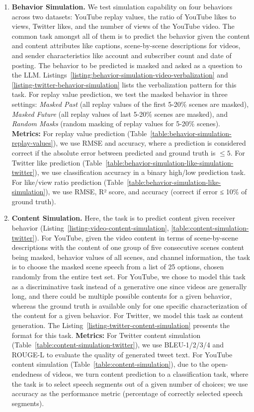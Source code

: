 \begin{enumerate}[leftmargin=*]
    \item\textbf{Behavior Simulation.} We test simulation capability on four behaviors across two datasets: YouTube replay values, the ratio of YouTube likes to views, Twitter likes, and the number of views of the YouTube video. The common task amongst all of them is to predict the behavior given the content and content attributes like captions, scene-by-scene descriptions for videos, and sender characteristics like account and subscriber count and date of posting. The behavior to be predicted is masked and asked as a question to the LLM. Listings~\ref{listing:behavior-simulation-video-verbalization} and \ref{listing-twitter-behavior-simulation} lists the verbalization pattern for this task. For replay value prediction, we test the masked behavior in three settings: \textit{Masked Past} (all replay values of the first 5-20\% scenes are masked), \textit{Masked Future} (all replay values of last 5-20\% scenes are masked), and \textit{Random Masks} (random masking of replay values for 5-20\% scenes). \textbf{Metrics:} For replay value prediction (Table~\ref{table:behavior-simulation-replay-values}), we use RMSE and accuracy, where a prediction is considered correct if the absolute error between predicted and ground truth is $\leq 5$. For Twitter like prediction (Table~\ref{table:behavior-simulation-like-simulation-twitter}), we use classification accuracy in a binary high/low prediction task. For like/view ratio prediction (Table~\ref{table:behavior-simulation-like-simulation}), we use RMSE, R² score, and accuracy (correct if error ≤ 10\% of ground truth).

    \item\textbf{Content Simulation.} Here, the task is to predict content given receiver behavior (Listing~\ref{listing-video-content-simulation}, \ref{table:content-simulation-twitter}). For YouTube, given the video content in terms of scene-by-scene descriptions with the content of one group of five consecutive scenes content being masked, behavior values of all scenes, and channel information, the task is to choose the masked scene speech from a list of 25 options, chosen randomly from the entire test set. For YouTube, we chose to model this task as a discriminative task instead of a generative one since videos are generally long, and there could be multiple possible contents for a given behavior, whereas the ground truth is available only for one specific characterization of the content for a given behavior. For Twitter, we model this task as content generation. The Listing~\ref{listing-twitter-content-simulation} presents the format for this task. \textbf{Metrics:} For Twitter content simulation (Table~\ref{table:content-simulation-twitter}), we use BLEU-1/2/3/4 and ROUGE-L to evaluate the quality of generated tweet text. For YouTube content simulation (Table~\ref{table:content-simulation}), due to the open-endedness of videos, we turn content prediction to a classification task, where the task is to select speech segments out of a given number of choices; we use accuracy as the performance metric (percentage of correctly selected speech segments). 
    

\end{enumerate}
